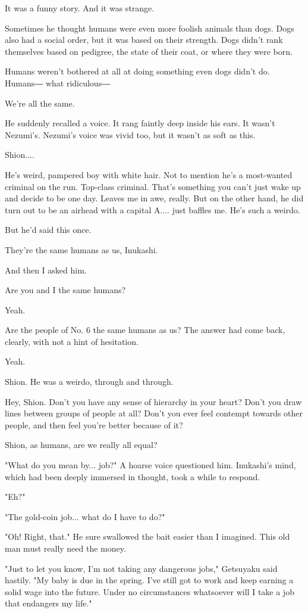 It was a funny story. And it was strange.

Sometimes he thought humans were even more foolish animals than dogs.
Dogs also had a social order, but it was based on their strength. Dogs
didn't rank themselves based on pedigree, the state of their coat, or
where they were born.

Humans weren't bothered at all at doing something even dogs didn't do.
Humans― what ridiculous―

We're all the same.

He suddenly recalled a voice. It rang faintly deep inside his ears. It
wasn't Nezumi's. Nezumi's voice was vivid too, but it wasn't as soft as
this.

Shion....

He's weird, pampered boy with white hair. Not to mention he's a
most-wanted criminal on the run. Top-class criminal. That's something
you can't just wake up and decide to be one day. Leaves me in awe,
really. But on the other hand, he did turn out to be an airhead with a
capital A.... just baffles me. He's such a weirdo.

But he'd said this once.

They're the same humans as us, Inukashi.

And then I asked him.

Are you and I the same humans?

Yeah.

Are the people of No. 6 the same humans as us? The answer had come back,
clearly, with not a hint of hesitation.

Yeah.

Shion. He was a weirdo, through and through.

Hey, Shion. Don't you have any sense of hierarchy in your heart? Don't
you draw lines between groups of people at all? Don't you ever feel
contempt towards other people, and then feel you're better because of
it?

Shion, as humans, are we really all equal?

"What do you mean by... job?" A hoarse voice questioned him. Inukashi's
mind, which had been deeply immersed in thought, took a while to
respond.

"Eh?"

"The gold-coin job... what do I have to do?"

"Oh! Right, that." He sure swallowed the bait easier than I imagined.
This old man must really need the money.

"Just to let you know, I'm not taking any dangerous jobs," Getsuyaku
said hastily. "My baby is due in the spring. I've still got to work and
keep earning a solid wage into the future. Under no circumstances
whatsoever will I take a job that endangers my life."

